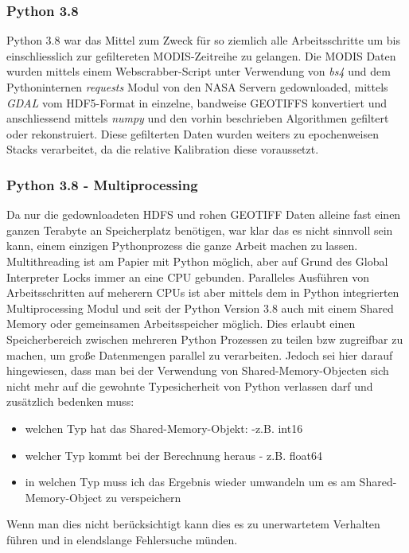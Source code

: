 \documentclass[11pt]{report}
\begin{document}
\subsubsection{Python 3.8}
Python 3.8 war das Mittel zum Zweck für so ziemlich alle Arbeitsschritte um bis einschliesslich zur gefiltereten MODIS-Zeitreihe zu gelangen. Die MODIS Daten wurden mittels einem Webscrabber-Script unter Verwendung von \emph{bs4} und dem Pythoninternen \emph{requests} Modul von den NASA Servern gedownloaded, mittels \emph{GDAL} vom HDF5-Format in einzelne, bandweise GEOTIFFS konvertiert und anschliessend mittels \emph{numpy} und den vorhin beschrieben Algorithmen gefiltert oder rekonstruiert. Diese gefilterten Daten wurden weiters zu epochenweisen Stacks verarbeitet, da die relative Kalibration diese voraussetzt.
\subsubsection{Python 3.8 - Multiprocessing}
Da nur die gedownloadeten HDFS und rohen GEOTIFF Daten alleine fast einen ganzen Terabyte an Speicherplatz benötigen, war klar das es nicht sinnvoll sein kann, einem einzigen Pythonprozess die ganze Arbeit machen zu lassen. Multithreading ist am Papier mit Python möglich, aber auf Grund des Global Interpreter Locks immer an eine CPU gebunden. Paralleles Ausführen von Arbeitsschritten auf meherern CPUs ist aber mittels dem in Python integrierten Multiprocessing Modul und seit der Python Version 3.8 auch mit einem Shared Memory oder gemeinsamen Arbeitsspeicher möglich. Dies erlaubt einen Speicherbereich zwischen mehreren Python Prozessen zu teilen bzw zugreifbar zu machen, um große Datenmengen parallel zu verarbeiten. Jedoch sei hier darauf hingewiesen, dass man bei der Verwendung von Shared-Memory-Objecten sich nicht mehr auf die gewohnte Typesicherheit von Python verlassen darf und zusätzlich bedenken muss: 
\begin{itemize}
\item welchen Typ hat das Shared-Memory-Objekt: -z.B. int16
\item welcher Typ kommt bei der Berechnung heraus - z.B. float64
\item in welchen Typ muss ich das Ergebnis wieder umwandeln um es am Shared-Memory-Object zu verspeichern
\end{itemize}
Wenn man dies nicht berücksichtigt kann dies es zu unerwartetem Verhalten führen und in elendslange Fehlersuche münden.
\end{document}
